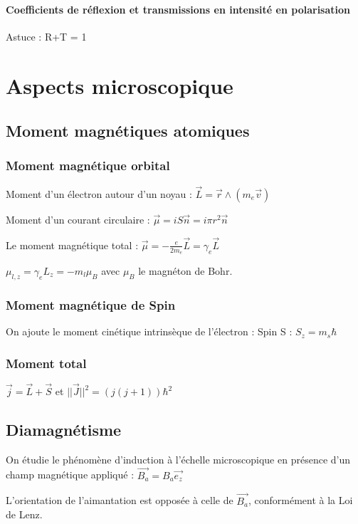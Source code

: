 \documentclass[french]{yLectureNote}
\renewcommand{\vec}{\overrightarrow}
\newcommand{\norm}[1]{||\vec{#1}||}
\begin{document}
\subsubsection{Coefficients de réflexion et transmissions en intensité en polarisation}
Astuce : R+T = 1
\chapter{Aspects microscopique}
\section{Moment magnétiques atomiques}
\subsection{Moment magnétique orbital}
\begin{definition}
    Moment d'un électron autour d'un noyau : $\vec{L} = \vec{r}\wedge (m_e \vec{v})$

    Moment d'un courant circulaire : $\vec{\mu} = iS\vec{n} = i\pi r^2\vec{n}$

    Le moment magnétique total : $\vec{\mu} = -\frac{e}{2m_e}\vec{L} = \gamma_e \vec{L}$
\end{definition}
\begin{definition}
    $\mu_{l,z} =\gamma_e L_z =  -m_l \mu_B$ avec $\mu_B$ le magnéton de Bohr.
\end{definition}
\subsection{Moment magnétique de Spin}
On ajoute le moment cinétique intrinsèque de l'électron : Spin S : $S_z = m_s \hbar$
\subsection{Moment total}
$\vec{j} = \vec{L} + \vec{S}$ et $\norm{J}^2 = (j(j+1))\hbar^2$
\section{Diamagnétisme}
On étudie le phénomène d'induction à l'échelle microscopique en présence d'un champ magnétique appliqué : $\vec{B_a} = B_a \vec{e_z}$

L'orientation de l'aimantation est opposée à celle de $\vec{B_a}$, conformément à la Loi de Lenz.
\end{document}
